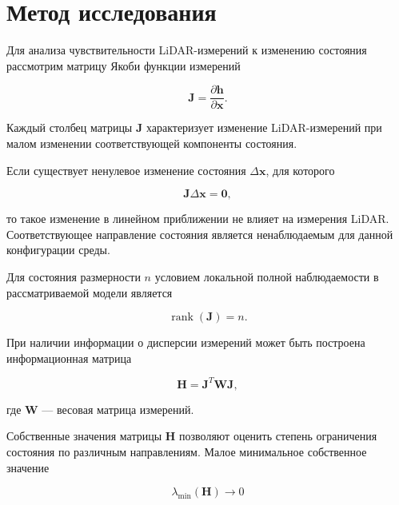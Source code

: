 \documentclass{misisarticle}
\begin{document}
\section{Метод исследования}

Для анализа чувствительности LiDAR-измерений к изменению состояния
рассмотрим матрицу Якоби функции измерений

\begin{equation}
    \mathbf{J}
    =
    \frac{\partial \mathbf{h}}
         {\partial \mathbf{x}}.
    \label{eq:jacobian}
\end{equation}

Каждый столбец матрицы $\mathbf{J}$ характеризует изменение
LiDAR-измерений при малом изменении соответствующей компоненты
состояния.

Если существует ненулевое изменение состояния
$\Delta\mathbf{x}$, для которого

\begin{equation}
    \mathbf{J}\Delta\mathbf{x} = \mathbf{0},
    \label{eq:nullspace}
\end{equation}

то такое изменение в линейном приближении не влияет
на измерения LiDAR. Соответствующее направление состояния
является ненаблюдаемым для данной конфигурации среды.

Для состояния размерности $n$ условием локальной полной
наблюдаемости в рассматриваемой модели является

\begin{equation}
    \operatorname{rank}(\mathbf{J}) = n.
    \label{eq:rank}
\end{equation}

При наличии информации о дисперсии измерений может быть построена
информационная матрица

\begin{equation}
    \mathbf{H}
    =
    \mathbf{J}^{T}
    \mathbf{W}
    \mathbf{J},
    \label{eq:information}
\end{equation}

где $\mathbf{W}$ --- весовая матрица измерений.

Собственные значения матрицы $\mathbf{H}$ позволяют оценить
степень ограничения состояния по различным направлениям.
Малое минимальное собственное значение

\begin{equation}
    \lambda_{\min}(\mathbf{H}) \rightarrow 0
    \label{eq:eigen}
\end{equation}
\end{document}
